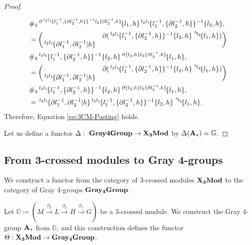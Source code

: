 \documentclass[11pt, reqno]{amsart} %
\newcommand{\act}[1]{\,\sp{#1}\!}
\newcommand{\TXMod}{{\bf X_3Mod}}
\newcommand{\Gray}{{\bf Gray4Group}}
\newcommand{\bG}{{\mathbb{G}}}
\theoremstyle{definition}
\theoremstyle{remark}
\numberwithin{equation}{section}
\begin{document}
\begin{proof}
\begin{enumerate}
\begin{align*}
    &\#_4
    \act{\partial\act{l_2l_1}\{l_1^{-1},\{\partial l_2^{-1},h\}\}^{-1}l_2\{\partial l_2^{-1},h\}}\{l_1,h\}\act{l_2l_1}\{l_1^{-1},\{\partial l_2^{-1},h\}\}^{-1}\{l_2,h\}, \\
    &= \begin{pmatrix} & \partial(\act{l_2l_1}\{l_1^{-1},\{\partial l_2^{-1},h\}\}^{-1}\{l_2,h\}\act{\act{h}l_2}\{l_1,h\}) \\ \act{l_2l_1}\{\partial l_1^{-1},\partial l_2^{-1}|h\} & \end{pmatrix} \\
    &\#_4
    \act{l_2l_1}\{l_1^{-1},\{\partial l_2^{-1},h\}\}^{-1}\{l_2,h\}\act{\partial \{l_2,h\}l_2\{\partial l_2^{-1},h\}}\{l_1,h\}, \\
    &= \begin{pmatrix} & \partial(\act{l_2l_1}\{l_1^{-1},\{\partial l_2^{-1},h\}\}^{-1}\{l_2,h\}\act{\act{h}l_2}\{l_1,h\}) \\ \act{l_2l_1}\{\partial l_1^{-1},\partial l_2^{-1}|h\} & \end{pmatrix} \\
    &\#_4
    \act{l_2l_1}\{l_1^{-1},\{\partial l_2^{-1},h\}\}^{-1}\{l_2,h\}\act{\partial \{l_2,h\}l_2\{\partial l_2^{-1},h\}}\{l_1,h\}, \\
    &= \act{l_2l_1}\{\partial l_1^{-1},\partial l_2^{-1}|h\}\act{l_2l_1}\{l_1^{-1},\{\partial l_2^{-1},h\}\}^{-1}\{l_2,h\}\act{\act{h}l_2}\{l_1,h\}.
  \end{align*}
  Therefore, Equation \eqref{eq:3CM-Pasting} holds.
\end{enumerate}
Let us define a functor $\Delta:~\Gray\to \TXMod$ by $\Delta({\bf A_*}) = \bG$. 

\end{proof}

\subsection{From 3-crossed modules to Gray 4-groups}
\label{3CM_to_Gray4}

We construct a functor from the category of 3-crossed modules $\TXMod$ to the category of Gray 4-groups ${\bf Gray_4Group}$.

Let $\bG \coloneqq ( M\overset{\partial_3}{\longrightarrow}L\overset{\partial_2}{\longrightarrow}H\overset{\partial_1}{\longrightarrow} G)$ be a 3-crossed module. We construct the Gray 4-group ${\bf A_*}$ from $\bG$, and this construction defines the functor $\Theta : \TXMod \rightarrow {\bf Gray_4Group}$.
\end{document}

